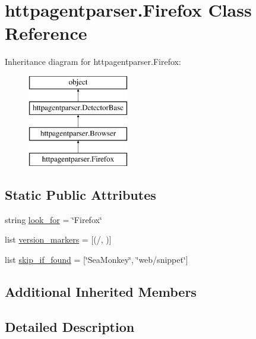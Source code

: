 \hypertarget{classhttpagentparser_1_1_firefox}{}\section{httpagentparser.\+Firefox Class Reference}
\label{classhttpagentparser_1_1_firefox}
Inheritance diagram for httpagentparser.\+Firefox\+:\begin{figure}[H]
\begin{center}
\leavevmode
\includegraphics[height=4.000000cm]{classhttpagentparser_1_1_firefox}
\end{center}
\end{figure}
\subsection*{Static Public Attributes}
\begin{DoxyCompactItemize}
\item 
string \hyperlink{classhttpagentparser_1_1_firefox_ac31233f472837790577b7e22eb10583d}{look\+\_\+for} = \char`\"{}Firefox\char`\"{}
\item 
list \hyperlink{classhttpagentparser_1_1_firefox_ac02dcb3e2250b7f4be5129cfcc52bb1d}{version\+\_\+markers} = \mbox{[}(\textquotesingle{}/\textquotesingle{}, \textquotesingle{}\textquotesingle{})\mbox{]}
\item 
list \hyperlink{classhttpagentparser_1_1_firefox_ad5ccd2de1e5754309628f85bcfb753a4}{skip\+\_\+if\+\_\+found} = \mbox{[}\char`\"{}Sea\+Monkey\char`\"{}, \char`\"{}web/snippet\char`\"{}\mbox{]}
\end{DoxyCompactItemize}
\subsection*{Additional Inherited Members}


\subsection{Detailed Description}


